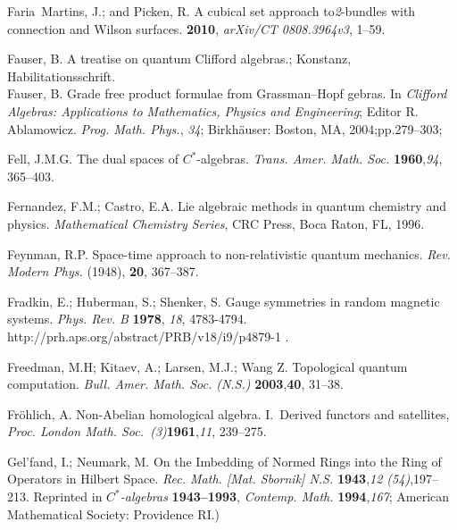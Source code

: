\documentclass[12pt]{article}
\theoremstyle{plain}
\theoremstyle{definition}
\numberwithin{equation}{section}
\begin{document}
\begin{thebibliography}{199}
Faria~Martins, J.; and Picken, R.  A cubical set approach to{\em 2}-bundles with connection and  Wilson surfaces. {\bf 2010}, {\em arXiv/CT} {\em 0808.3964v3}, 1--59.

Fauser, B.  A treatise on quantum Clifford algebras.; Konstanz, Habilitationsschrift. \\ 

Fauser, B.  Grade free product formulae from Grassman--Hopf gebras.  In  {\em Clifford Algebras: Applications to Mathematics, Physics and Engineering};
Editor R. Ablamowicz. \emph{Prog. Math. Phys.}, {\em 34}; Birkh\"{a}user: Boston, MA, 2004;pp.279--303; 


Fell, J.M.G. The dual spaces of  $C^*$-algebras. \emph{Trans. Amer. Math. Soc.} {\bf 1960},{\em 94}, 365--403.

Fernandez, F.M.; Castro, E.A. Lie  algebraic methods in quantum chemistry and physics. {\it Mathematical Chemistry Series}, CRC Press, Boca Raton, FL, 1996.

Feynman, R.P.  Space-time approach to non-relativistic quantum mechanics.  \emph{Rev. Modern Phys.} (1948), {\bf 20}, 367--387.

Fradkin, E.; Huberman, S.; Shenker, S. Gauge symmetries in random magnetic systems. {\em Phys. Rev. B} {\bf1978}, {\em 18}, 4783-4794. 
 http://prh.aps.org/abstract/PRB/v18/i9/p4879-1 .


Freedman, M.H; Kitaev, A.; Larsen, M.J.; Wang Z. Topological quantum computation.  \emph{Bull. Amer. Math. Soc. (N.S.)} {\bf 2003},{\bf 40}, 31--38.

Fr{\"o}hlich, A.  Non-Abelian homological algebra. I.~Derived functors and satellites, \emph{Proc. London Math. Soc.~(3)}{\bf 1961},{\em 11}, 239--275.

Gel'fand, I.;  Neumark, M. On the Imbedding of Normed Rings into the Ring of Operators in Hilbert Space. {\it Rec. Math. [Mat. Sbornik] N.S.} {\bf 1943},{\em  12 (54)},197--213.
Reprinted in {\em $C^*$-algebras} {\bf1943--1993}, \emph{Contemp. Math.} {\bf 1994},{\em 167}; American Mathematical Society: Providence RI.)


\end{thebibliography}
\end{document}

